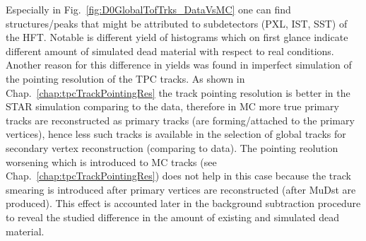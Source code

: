 Especially in Fig.~\ref{fig:D0GlobalTofTrks_DataVsMC} one can find structures/peaks that might be attributed to subdetectors (PXL, IST, SST) of the HFT. Notable is different yield of histograms which on first glance indicate different amount of simulated dead material with respect to real conditions. Another reason for this difference in yields was found in imperfect simulation of the pointing resolution of the TPC tracks. As shown in Chap.~\ref{chap:tpcTrackPointingRes} the track pointing resolution is better in the STAR simulation comparing to the data, therefore in MC more true primary tracks are reconstructed as primary tracks (are forming/attached to the primary vertices), hence less such tracks is available in the selection of global tracks for secondary vertex reconstruction (comparing to data). The pointing reolution worsening which is introduced to MC tracks (see Chap.~\ref{chap:tpcTrackPointingRes}) does not help in this case because the track smearing is introduced after primary vertices are reconstructed (after MuDst are produced). This effect is accounted later in the background subtraction procedure to reveal the studied difference in the amount of existing and simulated dead material.

